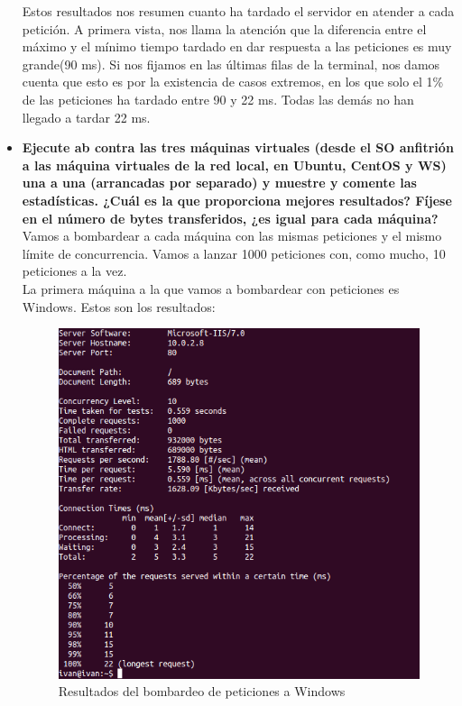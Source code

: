 \begin{itemize}
	Estos resultados nos resumen cuanto ha tardado el servidor en atender a cada petición. A primera vista, nos llama la atención que la diferencia entre el máximo y el mínimo tiempo tardado en dar respuesta a las peticiones es muy grande(90 ms). Si nos fijamos en las últimas filas de la terminal, nos damos cuenta que esto es por la existencia de casos extremos, en los que solo el 1\% de las peticiones ha tardado entre 90 y 22 ms. Todas las demás no han llegado a tardar 22 ms.
	
	\item \textbf{Ejecute ab contra las tres máquinas virtuales (desde el SO anfitrión a las máquina virtuales de la red local, en Ubuntu, CentOS y WS) una a una (arrancadas por separado) y muestre y comente las estadísticas. ¿Cuál es la que proporciona mejores resultados? Fíjese en el número de bytes transferidos, ¿es igual para cada máquina?}\\
	
	Vamos a bombardear a cada máquina con las mismas peticiones y el mismo límite de concurrencia. Vamos a lanzar 1000 peticiones con, como mucho, 10 peticiones a la vez.\\
	
	La primera máquina a la que vamos a bombardear con peticiones es Windows. Estos son los resultados:\\
	\begin{figure}[H]
		\centering
		\includegraphics[width=0.6\linewidth]{Windows-ab}
		\caption[Windows ab]{Resultados del bombardeo de peticiones a Windows}
		\label{fig:Windows-ab}
	\end{figure}
	

\end{itemize}

